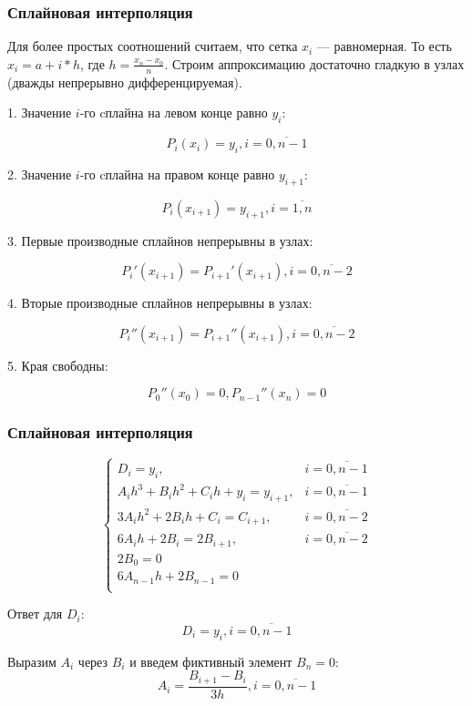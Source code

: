 \documentclass[10pt]{beamer}
\begin{document}
\begin{frame}[fragile]
\frametitle{Сплайновая интерполяция}

Для более простых соотношений считаем, что сетка $x_i$ --- равномерная. То есть $x_i = a + i * h$, где $h = \frac{x_n - x_0}{n}$. Строим аппроксимацию достаточно гладкую в узлах (дважды непрерывно дифференцируемая).


1. Значение $i$-го cплайна на левом конце равно $y_{i}$:

$$ P_i(x_{i}) = y_{i}, i = \overline{0, n-1} $$

2. Значение $i$-го cплайна на правом конце равно $y_{i+1}$:

$$ P_i(x_{i+1}) = y_{i+1}, i = \overline{1, n} $$

3. Первые производные сплайнов непрерывны в узлах:

$$ P_{i}'(x_{i+1}) = P_{i+1}'(x_{i+1}), i = \overline{0, n-2} $$

4. Вторые производные сплайнов непрерывны в узлах:

$$ P_{i}''(x_{i+1}) = P_{i+1}''(x_{i+1}), i = \overline{0, n-2} $$

5. Края свободны:

$$ P_0''(x_{0}) = 0, P_{n-1}''(x_{n}) = 0$$

\end{frame}

\begin{frame}[fragile]
\frametitle{Сплайновая интерполяция}
$$
\begin{cases}
D_i = y_{i}, 										& i = \overline{0, n-1} \\
A_i h^3 + B_i h^2 + C_i h + y_{i} = y_{i+1},		& i = \overline{0, n-1} \\
3 A_i h^2 + 2 B_i h + C_i = C_{i+1}, 				& i = \overline{0, n-2} \\
6 A_i h + 2 B_i = 2 B_{i+1},						& i = \overline{0, n-2} \\
2 B_0 = 0 											&\\
6 A_{n-1} h + 2 B_{n-1} = 0 						&\\
\end{cases}
$$

Ответ для $D_i$:
$$
	D_i = y_{i}, i = \overline{0, n-1}
$$

Выразим $A_i$ через $B_i$ и введем фиктивный элемент $B_{n} = 0$:
$$
	A_i = \frac{B_{i+1} - B_i}{3h},  i = \overline{0, n-1}
$$
\end{frame}
\end{document}
